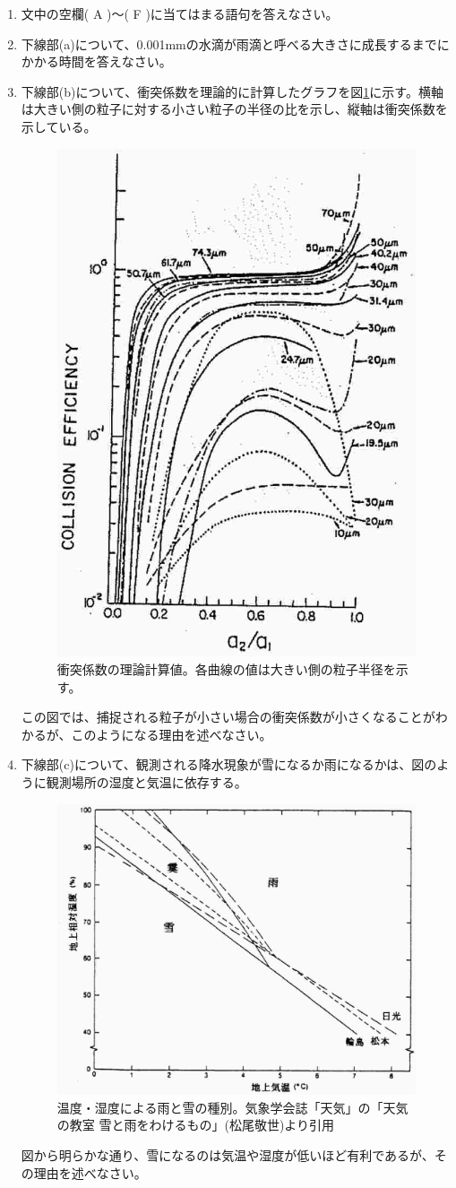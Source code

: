 \documentclass{jsarticle}
\newenvironment{problems}
{
  \renewcommand\labelenumi{\doublebox{\arabic{enumi}}}
  \begin{enumerate}
}{
  \end{enumerate}
  \renewcommand\labelenumi{\arabic{enumi}.}
}
\begin{document}
\begin{problems}
        \begin{enumerate}[(1)]
        \item 文中の空欄( A )〜( F )に当てはまる語句を答えなさい。
        \item 下線部(a)について、0.001mmの水滴が雨滴と呼べる大きさに成長するまでにかかる時間を答えなさい。
        \item 下線部(b)について、衝突係数を理論的に計算したグラフを図\ref{CollisionEfficiency}に示す。横軸は大きい側の粒子に対する小さい粒子の半径の比を示し、縦軸は衝突係数を示している。
            \begin{figure}[ptbh]
            \centering
            \includegraphics[width=0.5\linewidth,keepaspectratio]{CollisionEfficiency.eps}
            \caption{衝突係数の理論計算値。各曲線の値は大きい側の粒子半径を示す。}\label{CollisionEfficiency}
            \end{figure}
              この図では、捕捉される粒子が小さい場合の衝突係数が小さくなることがわかるが、このようになる理由を述べなさい。
        \item 下線部(c)について、観測される降水現象が雪になるか雨になるかは、図のように観測場所の湿度と気温に依存する。
            \begin{figure}[ptbh]
            \centering
            \includegraphics[width=0.5\linewidth,keepaspectratio]{RainSnow.eps}
            \caption{温度・湿度による雨と雪の種別。気象学会誌「天気」の「天気の教室 雪と雨をわけるもの」(松尾敬世)より引用}\label{RainSnow}
            \end{figure}
              図から明らかな通り、雪になるのは気温や湿度が低いほど有利であるが、その理由を述べなさい。\clearpage
        \end{enumerate}


\end{problems}
\end{document}
